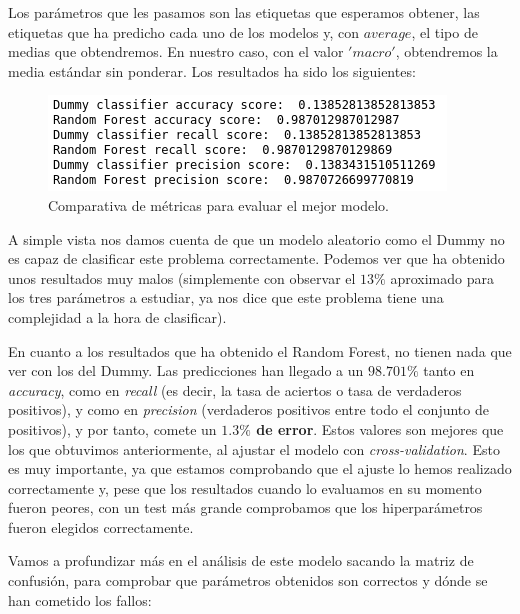 \documentclass[11pt,a4paper]{article}
\begin{document}
Los parámetros que les pasamos son las etiquetas que esperamos obtener, las etiquetas que ha predicho cada uno de los modelos y, con $average$, el tipo de medias que obtendremos. En nuestro caso, con el valor $'macro'$, obtendremos la media estándar sin ponderar. Los resultados ha sido los siguientes:

\begin{figure}[H]
    \centering
    \includegraphics{img/model-comp-scores.png}
    \caption{Comparativa de métricas para evaluar el mejor modelo.}
    \label{fig:model-comp-scores}
\end{figure}

A simple vista nos damos cuenta de que un modelo aleatorio como el Dummy no es capaz de clasificar este problema correctamente. Podemos ver que ha obtenido unos resultados muy malos (simplemente con observar el $13\%$ aproximado para los tres parámetros a estudiar, ya nos dice que este problema tiene una complejidad a la hora de clasificar).

En cuanto a los resultados que ha obtenido el Random Forest, no tienen nada que ver con los del Dummy. Las predicciones han llegado a un $98.701\%$ tanto en \textit{accuracy}, como en \textit{recall} (es decir, la tasa de aciertos o tasa de verdaderos positivos), y como en \textit{precision} (verdaderos positivos entre todo el conjunto de positivos), y por tanto, comete un \textbf{$1.3\%$ de error}. Estos valores son mejores que los que obtuvimos anteriormente, al ajustar el modelo con \textit{cross-validation}. Esto es muy importante, ya que estamos comprobando que el ajuste lo hemos realizado correctamente y, pese que los resultados cuando lo evaluamos en su momento fueron peores, con un test más grande comprobamos que los hiperparámetros fueron elegidos correctamente.

Vamos a profundizar más en el análisis de este modelo sacando la matriz de confusión, para comprobar que parámetros obtenidos son correctos y dónde se han cometido los fallos:
\end{document}
